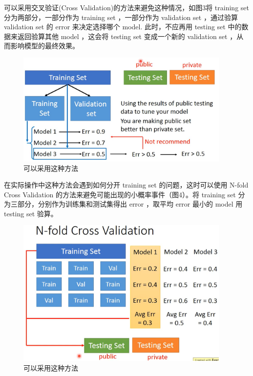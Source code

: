 \documentclass[UTF8,a4paper]{article}
\begin{document}
可以采用交叉验证(Cross Validation)的方法来避免这种情况，如图3将 training set 分为两部分，一部分作为 training set ，一部分作为 validation set ，通过验算 validation set 的 error 来决定选择哪个 model. 此时，不应再用 testing set 中的数据来返回验算其他 model ，这会将 testing set 变成一个新的 validation set ，从而影响模型的最终效果。
\begin{figure}[ht]
\centering
\includegraphics[width=300pt]{rec1.png}
\caption{可以采用这种方法}
\label{recommended1}
\end{figure}

在实际操作中这种方法会遇到如何分开 training set 的问题，这时可以使用 N-fold Cross Validation 的方法来避免可能出现的小概率事件（图4）。将 training set 分为三部分，分别作为训练集和测试集得出 error ，取平均 error 最小的 model 用 testing set 验算。

\newpage
\begin{figure}[ht]
\centering
\includegraphics[width=300pt]{rec2.png}
\caption{可以采用这种方法}
\label{recommended2}
\end{figure}
\end{document}
